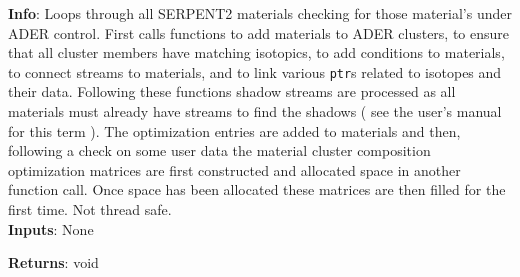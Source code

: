 \textbf{Info}: Loops through all SERPENT2 materials checking for those
material's under ADER control. First calls functions to add materials to ADER
clusters, to ensure that all cluster members have matching isotopics, to add
conditions to materials, to connect streams to materials, and to link
various \texttt{ptr}s related to isotopes and their data. Following these
functions shadow streams are processed as all materials must already have
streams to find the shadows ( see the user's manual for this term ). 
The optimization entries are added to materials and then, following a check
on some user data the material cluster composition optimization matrices are
first constructed and allocated space in another function call. Once space has
been allocated these matrices are then filled for the first time. Not thread
safe.\\

\noindent \textbf{Inputs}: None

\noindent \textbf{Returns}: void
